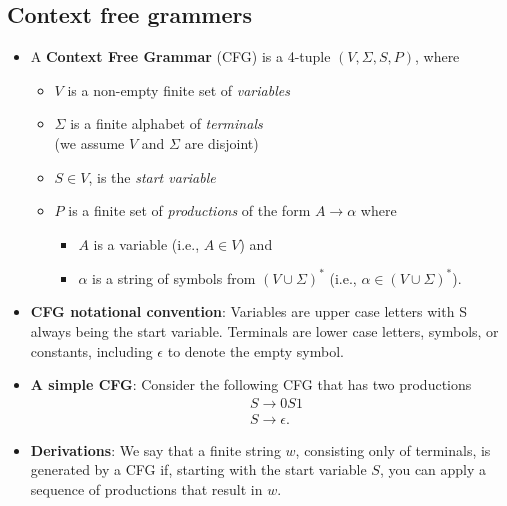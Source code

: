 \documentclass{report}
\begin{document}
    \subsection{Context free grammers}
    \begin{itemize}

        \item A \textbf{Context Free Grammar} (CFG) is a 4-tuple \((V, \Sigma, S, P)\), where
            \begin{itemize}
                \item \(V\) is a non-empty finite set of \textit{variables}
                \item \(\Sigma\) is a finite alphabet of \textit{terminals}\\
                    (we assume \(V\) and \(\Sigma\) are disjoint)
                \item \(S \in V\), is the \textit{start variable}
                \item \(P\) is a finite set of \textit{productions} of the form \(A \rightarrow \alpha\) where
                    \begin{itemize}
                        \item \(A\) is a variable (i.e., \(A \in V\)) and
                        \item \(\alpha\) is a string of symbols from \((V \cup \Sigma)^*\) (i.e., \(\alpha \in (V \cup \Sigma)^*\)).
                    \end{itemize}
            \end{itemize}   
        \item \textbf{CFG notational convention}: 
            Variables are upper case letters with S always being the start variable.
            \bigbreak \noindent 
            Terminals are lower case letters, symbols, or constants, including $\epsilon$ to denote the empty symbol.
        \item \textbf{A simple CFG}: Consider the following CFG that has two productions
            \begin{align*}
                &S \to 0S1 \\
                &S \to \epsilon
            .\end{align*}
        \item \textbf{Derivations}:
            We say that a finite string $w$, consisting only of terminals, is generated by a CFG if, starting with the start variable $S$, you can apply a sequence of productions that result in $w$.
            \bigbreak \noindent 

\end{itemize}
\end{document}
